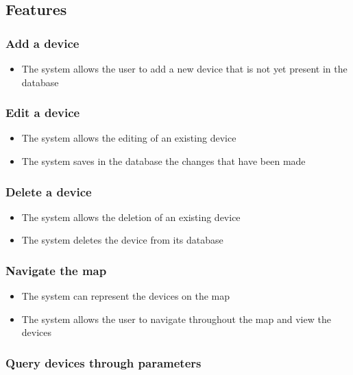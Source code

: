 \documentclass{scrreprt}
\begin{document}
\subsection{Features}

\subsubsection{Add a device}

\begin{itemize}
    \item The system allows the user to add a new device that is not yet present in the database
\end{itemize}

\subsubsection{Edit a device}

\begin{itemize}
    \item The system allows the editing of an existing device
    \item The system saves in the database the changes that have been made
\end{itemize}

\subsubsection{Delete a device}

\begin{itemize}
    \item The system allows the deletion of an existing device
    \item The system deletes the device from its database
\end{itemize}

\subsubsection{Navigate the map}

\begin{itemize}
    \item The system can represent the devices on the map
    \item The system allows the user to navigate throughout the map and view the devices
\end{itemize}

\subsubsection{Query devices through parameters}
\end{document}

